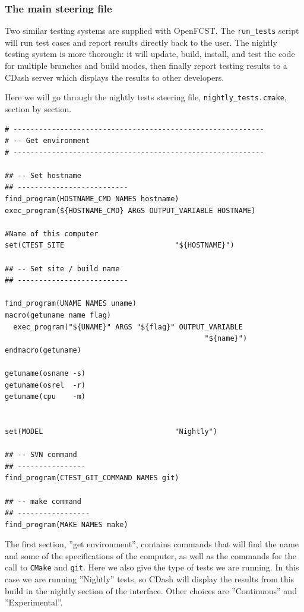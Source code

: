 \subsubsection{The main steering file}

Two similar testing systems are supplied with OpenFCST. The \verb!run_tests! script will run test cases and report results directly back to the user. The nightly testing system is more thorough: it will update, build, install, and test the code for multiple branches and build modes, then finally report testing results to a CDash server which displays the results to other developers.

Here we will go through the nightly tests steering file, \verb!nightly_tests.cmake!, section by section.

\small \begin{lstlisting}
# -----------------------------------------------------------  
# -- Get environment
# -----------------------------------------------------------  

## -- Set hostname
## --------------------------
find_program(HOSTNAME_CMD NAMES hostname)
exec_program(${HOSTNAME_CMD} ARGS OUTPUT_VARIABLE HOSTNAME)

#Name of this computer
set(CTEST_SITE                          "${HOSTNAME}")

## -- Set site / build name
## --------------------------

find_program(UNAME NAMES uname)
macro(getuname name flag)
  exec_program("${UNAME}" ARGS "${flag}" OUTPUT_VARIABLE
                                               "${name}")
endmacro(getuname)

getuname(osname -s)
getuname(osrel  -r)
getuname(cpu    -m)


set(MODEL                               "Nightly")

## -- SVN command
## ----------------
find_program(CTEST_GIT_COMMAND NAMES git)

## -- make command
## -----------------
find_program(MAKE NAMES make)
\end{lstlisting}\normalsize

The first section, ''get environment'', contains commands that will find the name and some of the specifications of the computer, as well as the commands for the call to \verb!CMake! and \verb!git!. Here we also give the type of tests we are running. In this case we are running ''Nightly'' tests, so CDash will display the results from this build in the nightly section of the interface. Other choices are ''Continuous'' and ''Experimental''.

